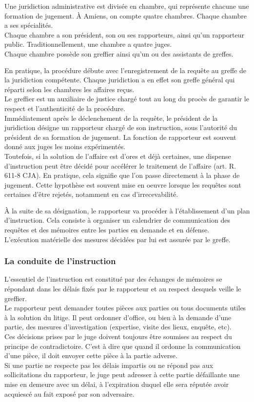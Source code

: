 \documentclass[10pt, a4paper, openany]{book}
\begin{document}
Une juridiction administrative est divisée en chambre, qui représente chacune une formation de jugement. À Amiens, on compte quatre chambres. Chaque chambre a ses spécialités. \\
Chaque chambre a son président, son ou ses rapporteurs, ainsi qu'un rapporteur public. Traditionnellement, une chambre a quatre juges. \\
Chaque chambre possède son greffier ainsi qu'un ou des assistants de greffes. 


En pratique, la procédure débute avec l'enregistrement de la requête au greffe de la juridiction compétente. Chaque juridiction a en effet son greffe général qui réparti selon les chambres les affaires reçus. \\
Le greffier est un auxiliaire de justice chargé tout au long du procès de garantir le respect et l'authenticité de la procédure. \\
Immédiatement après le déclenchement de la requête, le président de la juridiction désigne un rapporteur chargé de son instruction, sous l'autorité du président de sa formation de jugement. La fonction de rapporteur est souvent donné aux juges les moins expérimentés. \\
Toutefois, si la solution de l'affaire est d'ores et déjà certaines, une dispense d'instruction peut être décidé pour accélérer le traitement de l'affaire (art. R. 611-8 CJA). En pratique, cela signifie que l'on passe directement à la phase de jugement. Cette hypothèse est souvent mise en oeuvre lorsque les requêtes sont certaines d'être rejetés, notamment en cas d'irrecevabilité. 


À la suite de sa désignation, le rapporteur va procéder à l'établissement d'un plan d'instruction. Cela consiste à organiser un calendrier de communication des requêtes et des mémoires entre les parties en demande et en défense. \\
L'exécution matérielle des mesures décidées par lui est assurée par le greffe. 

\subsubsection{La conduite de l'instruction}

L'essentiel de  l'instruction est constitué par des échanges de mémoires se répondant dans les délais fixés par le rapporteur et au respect desquels veille le greffier. \\
Le rapporteur peut demander toutes pièces aux parties ou tous documents utiles à la solution du litige. Il peut ordonner d'office, ou bien à la demande d'une partie, des mesures d'investigation (expertise, visite des lieux, enquête, etc). \\
Ces décisions prises par le juge doivent toujours être soumises au respect du principe de contradictoire. C'est à dire que quand il ordonne la communication d'une pièce, il doit envoyer cette pièce à la partie adverse. \\
Si une partie ne respecte pas les délais impartis ou ne répond pas aux sollicitations du rapporteur, le juge peut adresser à cette partie défaillante une mise en demeure avec un délai, à l'expiration duquel elle sera réputée avoir acquiescé au fait exposé par son adversaire.
\end{document}

